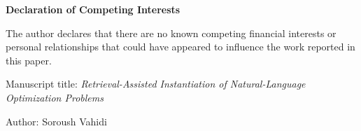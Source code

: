 \documentclass[12pt]{article}
\begin{document}
\begin{center}
{\Large \textbf{Declaration of Competing Interests}}
\end{center}

\vspace{1cm}

The author declares that there are no known competing financial interests or personal relationships that could have appeared to influence the work reported in this paper.

\vspace{1cm}

\noindent
Manuscript title: \textit{Retrieval-Assisted Instantiation of Natural-Language Optimization Problems}

\vspace{1cm}

\noindent
Author: Soroush Vahidi
\end{document}
